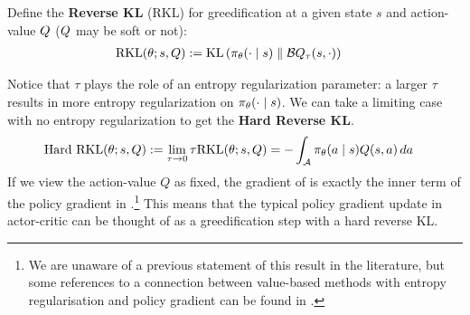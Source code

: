 \documentclass[\main/thesis.tex]{subfiles}
\begin{document}
Define the \textbf{Reverse KL} (RKL) for greedification at a given state $s$ and action-value ${Q}$ (${Q}$ may be soft or not):%
%
\begin{align*}
 \text{RKL}(\policyparams; s, \Qhat) &\defeq\KL\left( \pi_\policyparams(\cdot \mid s) \parallel \boltzmannQ_\tau(s, \cdot) \right)%
\end{align*}
%

Notice that $\tau$ plays the role of an entropy regularization parameter: a larger $\tau$ results in more entropy regularization on $\pi_\theta(\cdot \mid s)$.
We can take a limiting case with no entropy regularization to get the \textbf{Hard Reverse KL}.
%
\begin{align}\label{eq:hard-reverse-KL}
    \text{Hard RKL}(\theta; s, {Q}) := \lim_{\tau \to 0} \tau \text{RKL}(\theta; s, {Q}) &= -\int_{\mathcal{A}} \pi_\theta(a \mid s) Q(s, a)\, da
\end{align}
If we view the action-value $Q$ as fixed, the gradient of  is exactly the inner term of the policy gradient in .\footnote{We are unaware of a previous statement of this result in the literature, but some references to a connection between value-based methods with entropy regularisation and policy gradient can be found in \citep{nachum2017bridging}.} 
This means that the typical policy gradient update in actor-critic can be thought of as a greedification step with a hard reverse KL. %
\end{document}
